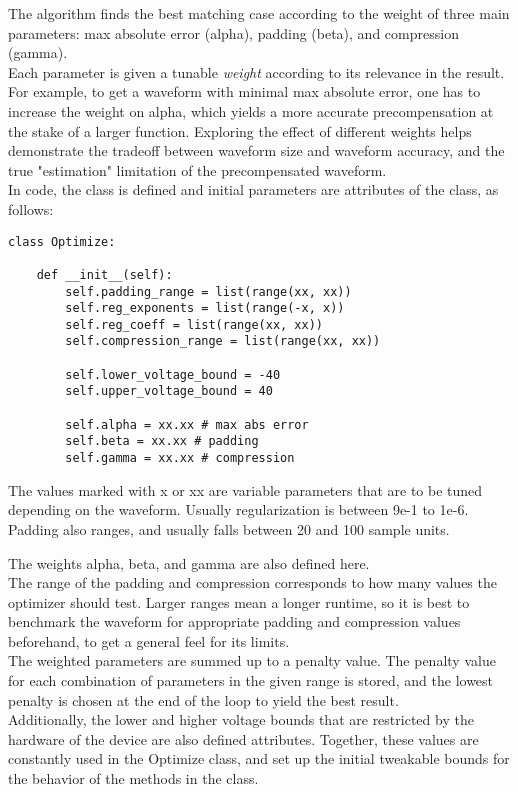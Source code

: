 \documentclass[11pt, a4paper]{article}
\theoremstyle{definition}
\numberwithin{equation}{section}
\begin{document}
The algorithm finds the best matching case according to the weight of three main parameters: max absolute error (alpha), padding (beta), and compression (gamma).
\\
Each parameter is given a tunable \textit{weight} according to its relevance in the result. For example, to get a waveform with minimal max absolute error, one has to increase the weight on alpha, which yields a more accurate precompensation at the stake of a larger function. Exploring the effect of different weights helps demonstrate the tradeoff between waveform size and waveform accuracy, and the true "estimation" limitation of the precompensated waveform.
\\
In code, the class is defined and initial parameters are attributes of the class, as follows:

\begin{verbatim}
class Optimize:
        
    def __init__(self):
        self.padding_range = list(range(xx, xx))
        self.reg_exponents = list(range(-x, x))      
        self.reg_coeff = list(range(xx, xx))
        self.compression_range = list(range(xx, xx))
        
        self.lower_voltage_bound = -40
        self.upper_voltage_bound = 40

        self.alpha = xx.xx # max abs error
        self.beta = xx.xx # padding
        self.gamma = xx.xx # compression
\end{verbatim}

The values marked with x or xx are variable parameters that are to be tuned depending on the waveform. Usually regularization is between 9e-1 to 1e-6. Padding also ranges, and usually falls between 20 and 100 sample units. 

The weights alpha, beta, and gamma are also defined here. 
\\
The range of the padding and compression corresponds to how many values the optimizer should test. Larger ranges mean a longer runtime, so it is best to benchmark the waveform for appropriate padding and compression values beforehand, to get a general feel for its limits.
\\
The weighted parameters are summed up to a penalty value. The penalty value for each combination of parameters in the given range is stored, and the lowest penalty is chosen at the end of the loop to yield the best result.
\\
Additionally, the lower and higher voltage bounds that are restricted by the hardware of the device are also defined attributes. Together, these values are constantly used in the Optimize class, and set up the initial tweakable bounds for the behavior of the methods in the class.
\end{document}

